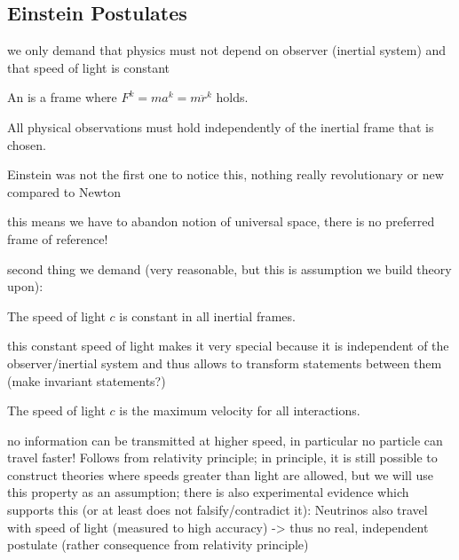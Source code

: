 		\subsection{Einstein Postulates}


we only demand that physics must not depend on observer (inertial system) and that speed of light is constant

\begin{defi}
An  is a frame where $F^k = m a^k = m \ddot{r}^k$ holds.
\end{defi}


\begin{post}
All physical observations must hold independently of the inertial frame that is chosen.
\end{post}
Einstein was not the first one to notice this, nothing really revolutionary or new compared to Newton

this means we have to abandon notion of universal space, there is no preferred frame of reference!



second thing we demand (very reasonable, but this is assumption we build theory upon):
\begin{post}
The speed of light $c$ is constant in all inertial frames.
\end{post}


this constant speed of light makes it very special because it is independent of the observer/inertial system and thus allows to transform statements between them (make invariant statements?)



\begin{prop}
The speed of light $c$ is the maximum velocity for all interactions.
\end{prop}
no information can be transmitted at higher speed, in particular no particle can travel faster! Follows from relativity principle; in principle, it is still possible to construct theories where speeds greater than light are allowed, but we will use this property as an assumption; there is also experimental evidence which supports this (or at least does not falsify/contradict it): Neutrinos also travel with speed of light (measured to high accuracy) -> thus no real, independent postulate (rather consequence from relativity principle)






